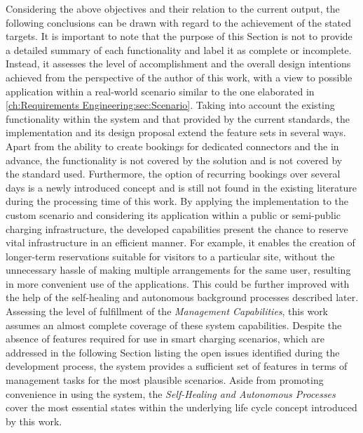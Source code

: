 \noindent Considering the above objectives and their relation to the current output, the following conclusions can be drawn with regard to the achievement of the stated targets. It is important to note that the purpose of this Section is not to provide a detailed summary of each functionality and label it as complete or incomplete. 
Instead, it assesses the level of accomplishment and the overall design intentions achieved from the perspective of the author of this work, with a view to possible application within a real-world scenario similar to the one elaborated in \ref{ch:Requirements Engineering:sec:Scenario}.
Taking into account the existing functionality within the system and that provided by the current standards, the implementation and its design proposal extend the feature sets in several ways.
Apart from the ability to create bookings for dedicated connectors and the  in advance, the functionality is not covered by the solution and is not covered by the standard used.
Furthermore, the option of recurring bookings over several days is a newly introduced concept and is still not found in the existing literature during the processing time of this work.
By applying the implementation to the custom scenario and considering its application within a public or semi-public charging infrastructure, the developed capabilities present the chance to reserve vital infrastructure in an efficient manner.
For example, it enables the creation of longer-term reservations suitable for visitors to a particular site, without the unnecessary hassle of making multiple arrangements for the same user, resulting in more convenient use of the applications. This could be further improved with the help of the self-healing and autonomous background processes described later.
Assessing the level of fulfillment of the \textit{Management Capabilities}, this work assumes an almost complete coverage of these system capabilities. 
Despite the absence of features required for use in smart charging scenarios, which are addressed in the following Section listing the open issues identified during the development process, the system provides a sufficient set of features in terms of management tasks for the most plausible scenarios.
Aside from promoting convenience in using the system, the \textit{Self-Healing and Autonomous Processes} cover the most essential states within the underlying life cycle concept introduced by this work.
